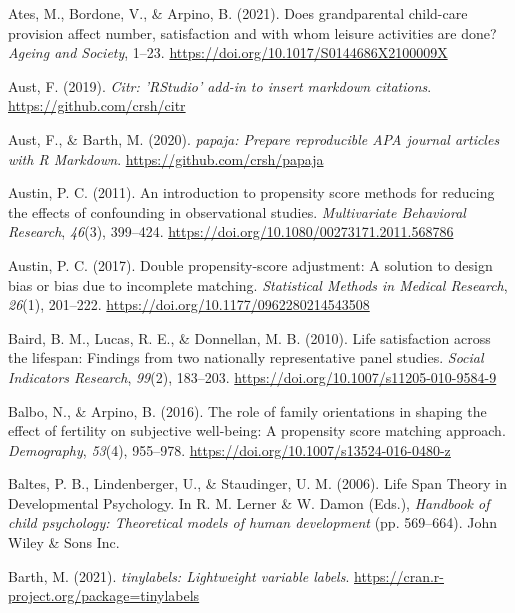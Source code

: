 \documentclass[
  english,
  man,floatsintext]{apa7}
\begin{document}
\leavevmode\hypertarget{ref-atesDoesGrandparentalChildcare2021}{}%
Ates, M., Bordone, V., \& Arpino, B. (2021). Does grandparental child-care provision affect number, satisfaction and with whom leisure activities are done? \emph{Ageing and Society}, 1--23. \url{https://doi.org/10.1017/S0144686X2100009X}

\leavevmode\hypertarget{ref-R-citr}{}%
Aust, F. (2019). \emph{Citr: 'RStudio' add-in to insert markdown citations}. \url{https://github.com/crsh/citr}

\leavevmode\hypertarget{ref-R-papaja}{}%
Aust, F., \& Barth, M. (2020). \emph{papaja: Prepare reproducible APA journal articles with R Markdown}. \url{https://github.com/crsh/papaja}

\leavevmode\hypertarget{ref-austinIntroductionPropensityScore2011}{}%
Austin, P. C. (2011). An introduction to propensity score methods for reducing the effects of confounding in observational studies. \emph{Multivariate Behavioral Research}, \emph{46}(3), 399--424. \url{https://doi.org/10.1080/00273171.2011.568786}

\leavevmode\hypertarget{ref-austinDoublePropensityscoreAdjustment2017}{}%
Austin, P. C. (2017). Double propensity-score adjustment: A solution to design bias or bias due to incomplete matching. \emph{Statistical Methods in Medical Research}, \emph{26}(1), 201--222. \url{https://doi.org/10.1177/0962280214543508}

\leavevmode\hypertarget{ref-bairdLifeSatisfactionLifespan2010}{}%
Baird, B. M., Lucas, R. E., \& Donnellan, M. B. (2010). Life satisfaction across the lifespan: Findings from two nationally representative panel studies. \emph{Social Indicators Research}, \emph{99}(2), 183--203. \url{https://doi.org/10.1007/s11205-010-9584-9}

\leavevmode\hypertarget{ref-balboRoleFamilyOrientations2016}{}%
Balbo, N., \& Arpino, B. (2016). The role of family orientations in shaping the effect of fertility on subjective well-being: A propensity score matching approach. \emph{Demography}, \emph{53}(4), 955--978. \url{https://doi.org/10.1007/s13524-016-0480-z}

\leavevmode\hypertarget{ref-baltesLifeSpanTheory2006}{}%
Baltes, P. B., Lindenberger, U., \& Staudinger, U. M. (2006). Life Span Theory in Developmental Psychology. In R. M. Lerner \& W. Damon (Eds.), \emph{Handbook of child psychology: Theoretical models of human development} (pp. 569--664). John Wiley \& Sons Inc.

\leavevmode\hypertarget{ref-R-tinylabels}{}%
Barth, M. (2021). \emph{tinylabels: Lightweight variable labels}. \url{https://cran.r-project.org/package=tinylabels}
\end{document}
